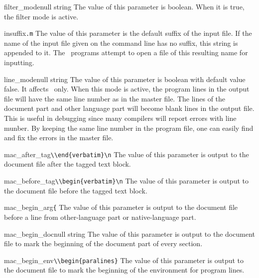 \begin{describepara}{filter_mode}{null string}\describe
The value of this parameter is boolean. When it is true, the filter
mode is active.
\end{describepara}
\begin{describepara}{insuffix}{\verb*|.m|}\describe
The value of this parameter is the default suffix of the input file.
If the name of the input file given on the command line has no suffix,
this string is appended to it. The \mweb\ programs attempt to open a
file of this resulting name for inputting.
\end{describepara}
\begin{describepara}{line_mode}{null string}\describe
The value of this parameter is boolean with default value false.
It affects \tangle\ only. When this mode is active,
the program lines in the output file will have the same line
number as in the master file. The lines of the document part and other
language part will become blank lines in the output file. This is
useful in debugging since many compilers will report errors with line
munber. By keeping the same line number in the program file, one can
easily find and fix the errors in the master file.
\end{describepara}
\begin{describepara}{mac_after_tag}{\verb*|\\end{verbatim}\n|}\describe
The value of this parameter is output to the document file after the
tagged text block.
\end{describepara}
\begin{describepara}{mac_before_tag}{\verb*|\\begin{verbatim}\n|}\describe
The value of this parameter is output to the document file before the
tagged text block.
\end{describepara}
\begin{describepara}{mac_begin_arg}{\verb*|{|}\describe
The value of this parameter is output to the document file before a line
from other-language part or native-language part.
\end{describepara}
\begin{describepara}{mac_begin_doc}{null string}\describe
The value of this parameter is output to the document file to mark
the beginning of the document part of every section.
\end{describepara}
\begin{describepara}{mac_begin_env}{\verb*|\\begin{paralines}|}\describe
The value of this parameter is output to the document file to
mark the beginning of the environment for program lines.
\end{describepara}
